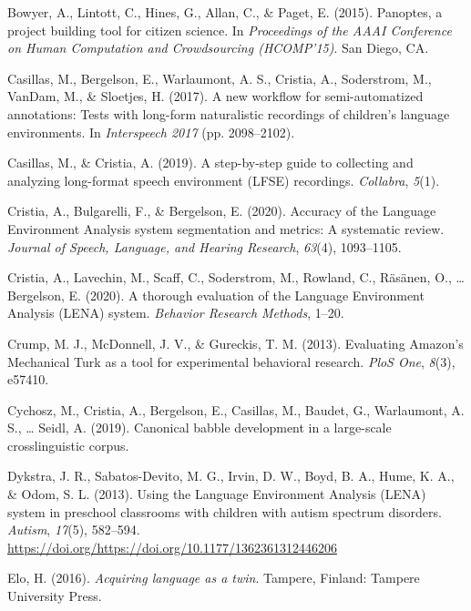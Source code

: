 \documentclass[english,,man]{apa6}
\begin{document}
\leavevmode\hypertarget{ref-bowyer2015panoptes}{}%
Bowyer, A., Lintott, C., Hines, G., Allan, C., \& Paget, E. (2015). Panoptes, a project building tool for citizen science. In \emph{Proceedings of the AAAI Conference on Human Computation and Crowdsourcing (HCOMP'15)}. San Diego, CA.

\leavevmode\hypertarget{ref-casillas2017new}{}%
Casillas, M., Bergelson, E., Warlaumont, A. S., Cristia, A., Soderstrom, M., VanDam, M., \& Sloetjes, H. (2017). A new workflow for semi-automatized annotations: Tests with long-form naturalistic recordings of children's language environments. In \emph{Interspeech 2017} (pp. 2098--2102).

\leavevmode\hypertarget{ref-casillas2019step}{}%
Casillas, M., \& Cristia, A. (2019). A step-by-step guide to collecting and analyzing long-format speech environment (LFSE) recordings. \emph{Collabra}, \emph{5}(1).

\leavevmode\hypertarget{ref-cristia2020accuracy}{}%
Cristia, A., Bulgarelli, F., \& Bergelson, E. (2020). Accuracy of the Language Environment Analysis system segmentation and metrics: A systematic review. \emph{Journal of Speech, Language, and Hearing Research}, \emph{63}(4), 1093--1105.

\leavevmode\hypertarget{ref-cristia2020thorough}{}%
Cristia, A., Lavechin, M., Scaff, C., Soderstrom, M., Rowland, C., Räsänen, O., \ldots{} Bergelson, E. (2020). A thorough evaluation of the Language Environment Analysis (LENA) system. \emph{Behavior Research Methods}, 1--20.

\leavevmode\hypertarget{ref-crump2013evaluating}{}%
Crump, M. J., McDonnell, J. V., \& Gureckis, T. M. (2013). Evaluating Amazon's Mechanical Turk as a tool for experimental behavioral research. \emph{PloS One}, \emph{8}(3), e57410.

\leavevmode\hypertarget{ref-cychosz2019canonical}{}%
Cychosz, M., Cristia, A., Bergelson, E., Casillas, M., Baudet, G., Warlaumont, A. S., \ldots{} Seidl, A. (2019). Canonical babble development in a large-scale crosslinguistic corpus.

\leavevmode\hypertarget{ref-Dykstra2013}{}%
Dykstra, J. R., Sabatos-Devito, M. G., Irvin, D. W., Boyd, B. A., Hume, K. A., \& Odom, S. L. (2013). Using the Language Environment Analysis (LENA) system in preschool classrooms with children with autism spectrum disorders. \emph{Autism}, \emph{17}(5), 582--594. \url{https://doi.org/https://doi.org/10.1177/1362361312446206}

\leavevmode\hypertarget{ref-Elo}{}%
Elo, H. (2016). \emph{Acquiring language as a twin}. Tampere, Finland: Tampere University Press.
\end{document}
